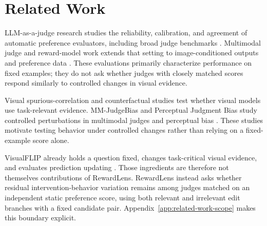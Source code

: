 \section{Related Work}
\label{sec:related_work}

LLM-as-a-judge research studies the reliability, calibration, and agreement of
automatic preference evaluators, including broad judge benchmarks
\citep{zheng2023judging,tan2025judgebench,zhou2025jetts,yang2025reliablejudge}.
Multimodal judge and reward-model work extends that setting to
image-conditioned outputs and preference data
\citep{chen2024mllmjudge,chen2025mjbench,ko2025flexjudge,yasunaga2025multimodal,
hu2026multimodalrewardbench2,zhang2026r1reward,jin2026omnireward}.
These evaluations primarily characterize performance on fixed examples; they
do not ask whether judges with closely matched scores respond similarly to
controlled changes in visual evidence.

Visual spurious-correlation and counterfactual studies test whether visual
models use task-relevant evidence. MM-JudgeBias and Perceptual Judgment Bias
study controlled perturbations in multimodal judges and perceptual bias
\citep{li2025devil,yang2025spuriverse,gao2025scope,lee2026mmjudgebias,
park2026mitigating}. These studies motivate testing behavior under controlled
changes rather than relying on a fixed-example score alone.

VisualFLIP already holds a question fixed, changes task-critical visual
evidence, and evaluates prediction updating \citep{zhu2026visualflip}. Those
ingredients are therefore not themselves contributions of RewardLens.
RewardLens instead asks whether residual intervention-behavior variation
remains among judges matched on an independent static preference score, using
both relevant and irrelevant edit branches with a fixed candidate pair.
Appendix~\ref{app:related-work-scope} makes this boundary explicit.

\begin{table}[h]
\centering
\small
\caption{Positioning against the closest controlled-audit work. A check mark
denotes an explicit analysis component, not an overall judgment of scope or
quality. ``Fixed pair'' means that both the question and the two candidate
responses are held constant while the image changes.}
\label{tab:related-work-positioning}
\end{table}
\FloatBarrier
